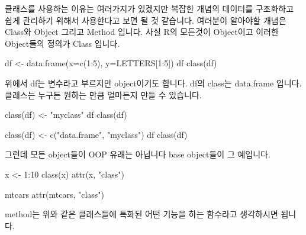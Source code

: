 \documentclass[
]{book}
\newenvironment{Shaded}{\begin{snugshade}}{\end{snugshade}}
\newcommand{\AttributeTok}[1]{\textcolor[rgb]{0.77,0.63,0.00}{#1}}
\newcommand{\DecValTok}[1]{\textcolor[rgb]{0.00,0.00,0.81}{#1}}
\newcommand{\FunctionTok}[1]{\textcolor[rgb]{0.00,0.00,0.00}{#1}}
\newcommand{\NormalTok}[1]{#1}
\newcommand{\OtherTok}[1]{\textcolor[rgb]{0.56,0.35,0.01}{#1}}
\newcommand{\SpecialCharTok}[1]{\textcolor[rgb]{0.00,0.00,0.00}{#1}}
\newcommand{\StringTok}[1]{\textcolor[rgb]{0.31,0.60,0.02}{#1}}
\begin{document}
클래스를 사용하는 이유는 여러가지가 있겠지만 복잡한 개념의 데이터를 구조화하고 쉽게 관리하기 위해서 사용한다고 보면 될 것 같습니다. 여러분이 알아야할 개념은 Class와 Object 그리고 Method 입니다. 사실 R의 모든것이 Object이고 이러한 Object들의 정의가 Class 입니다.

\begin{Shaded}
\begin{Highlighting}[]

\NormalTok{df }\OtherTok{\textless{}{-}} \FunctionTok{data.frame}\NormalTok{(}\AttributeTok{x=}\FunctionTok{c}\NormalTok{(}\DecValTok{1}\SpecialCharTok{:}\DecValTok{5}\NormalTok{), }\AttributeTok{y=}\NormalTok{LETTERS[}\DecValTok{1}\SpecialCharTok{:}\DecValTok{5}\NormalTok{])}
\NormalTok{df}
\FunctionTok{class}\NormalTok{(df)}
\end{Highlighting}
\end{Shaded}

위에서 df는 변수라고 부르지만 object이기도 합니다. df의 class는 data.frame 입니다. 클래스는 누구든 원하는 만큼 얼마든지 만들 수 있습니다.

\begin{Shaded}
\begin{Highlighting}[]

\FunctionTok{class}\NormalTok{(df) }\OtherTok{\textless{}{-}} \StringTok{"myclass"}
\NormalTok{df}
\FunctionTok{class}\NormalTok{(df)}

\FunctionTok{class}\NormalTok{(df) }\OtherTok{\textless{}{-}} \FunctionTok{c}\NormalTok{(}\StringTok{"data.frame"}\NormalTok{, }\StringTok{"myclass"}\NormalTok{)}
\NormalTok{df}
\FunctionTok{class}\NormalTok{(df)}
\end{Highlighting}
\end{Shaded}

그런데 모든 object들이 OOP 유래는 아닙니다 base object들이 그 예입니다.

\begin{Shaded}
\begin{Highlighting}[]
\NormalTok{x }\OtherTok{\textless{}{-}} \DecValTok{1}\SpecialCharTok{:}\DecValTok{10}
\FunctionTok{class}\NormalTok{(x)}
\FunctionTok{attr}\NormalTok{(x, }\StringTok{"class"}\NormalTok{)}

\NormalTok{mtcars}
\FunctionTok{attr}\NormalTok{(mtcars, }\StringTok{"class"}\NormalTok{)}
\end{Highlighting}
\end{Shaded}

method는 위와 같은 클래스들에 특화된 어떤 기능을 하는 함수라고 생각하시면 됩니다.
\end{document}
